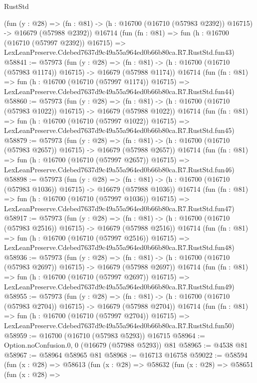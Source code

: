 \begin{lexlean}{RustStd}
\begin{coremodule}
    (fun (y : @28) =>
    (fn : @81) -> (h : @16700 (@16710 (@57983 @2392)) @16715) -> @16679 (@57988 @2392))
    @16714
    (fun (fn : @81) =>
    fun (h : @16700 (@16710 (@57997 @2392)) @16715) =>
    LexLeanPreserve.Cdebed7637d9c49a55a964ed0b66b80ca.R7.RustStd.fun43)
@58841 := @57973
    (fun (y : @28) =>
    (fn : @81) -> (h : @16700 (@16710 (@57983 @1174)) @16715) -> @16679 (@57988 @1174))
    @16714
    (fun (fn : @81) =>
    fun (h : @16700 (@16710 (@57997 @1174)) @16715) =>
    LexLeanPreserve.Cdebed7637d9c49a55a964ed0b66b80ca.R7.RustStd.fun44)
@58860 := @57973
    (fun (y : @28) =>
    (fn : @81) -> (h : @16700 (@16710 (@57983 @1022)) @16715) -> @16679 (@57988 @1022))
    @16714
    (fun (fn : @81) =>
    fun (h : @16700 (@16710 (@57997 @1022)) @16715) =>
    LexLeanPreserve.Cdebed7637d9c49a55a964ed0b66b80ca.R7.RustStd.fun45)
@58879 := @57973
    (fun (y : @28) =>
    (fn : @81) -> (h : @16700 (@16710 (@57983 @2657)) @16715) -> @16679 (@57988 @2657))
    @16714
    (fun (fn : @81) =>
    fun (h : @16700 (@16710 (@57997 @2657)) @16715) =>
    LexLeanPreserve.Cdebed7637d9c49a55a964ed0b66b80ca.R7.RustStd.fun46)
@58898 := @57973
    (fun (y : @28) =>
    (fn : @81) -> (h : @16700 (@16710 (@57983 @1036)) @16715) -> @16679 (@57988 @1036))
    @16714
    (fun (fn : @81) =>
    fun (h : @16700 (@16710 (@57997 @1036)) @16715) =>
    LexLeanPreserve.Cdebed7637d9c49a55a964ed0b66b80ca.R7.RustStd.fun47)
@58917 := @57973
    (fun (y : @28) =>
    (fn : @81) -> (h : @16700 (@16710 (@57983 @2516)) @16715) -> @16679 (@57988 @2516))
    @16714
    (fun (fn : @81) =>
    fun (h : @16700 (@16710 (@57997 @2516)) @16715) =>
    LexLeanPreserve.Cdebed7637d9c49a55a964ed0b66b80ca.R7.RustStd.fun48)
@58936 := @57973
    (fun (y : @28) =>
    (fn : @81) -> (h : @16700 (@16710 (@57983 @2697)) @16715) -> @16679 (@57988 @2697))
    @16714
    (fun (fn : @81) =>
    fun (h : @16700 (@16710 (@57997 @2697)) @16715) =>
    LexLeanPreserve.Cdebed7637d9c49a55a964ed0b66b80ca.R7.RustStd.fun49)
@58955 := @57973
    (fun (y : @28) =>
    (fn : @81) -> (h : @16700 (@16710 (@57983 @2704)) @16715) -> @16679 (@57988 @2704))
    @16714
    (fun (fn : @81) =>
    fun (h : @16700 (@16710 (@57997 @2704)) @16715) =>
    LexLeanPreserve.Cdebed7637d9c49a55a964ed0b66b80ca.R7.RustStd.fun50)
@58959 := @16700 (@16710 (@57983 @5293)) @16715
@58964 := Option.noConfusion.{0, 0} (@16679 (@57988 @5293)) @81
@58965 := @4538 @81
@58967 := @58964 @58965 @81
@58968 := @16713 @16758
@59022 := @58594
    (fun (x : @28) =>
    @58613
      (fun (x : @28) =>
      @58632
        (fun (x : @28) =>
        @58651
          (fun (x : @28) =>

\end{coremodule}
\end{lexlean}
